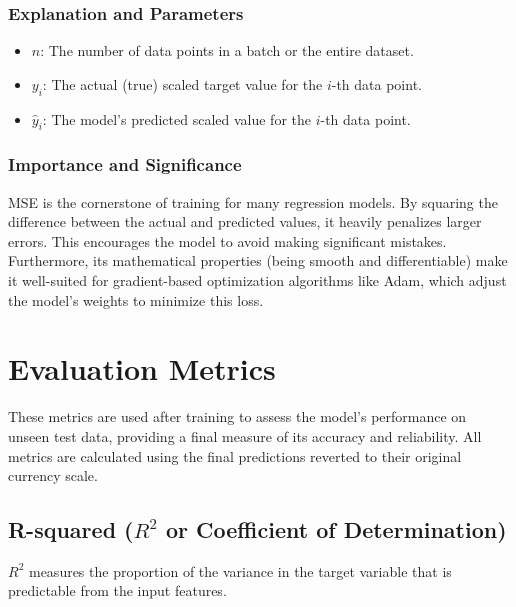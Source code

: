 \documentclass[12pt, a4paper]{article}
\begin{document}
\subsubsection{Explanation and Parameters}
\begin{itemize}
    \item \textbf{$n$}: The number of data points in a batch or the entire dataset.
    \item \textbf{$y_i$}: The actual (true) scaled target value for the $i$-th data point.
    \item \textbf{$\hat{y}_i$}: The model's predicted scaled value for the $i$-th data point.
\end{itemize}

\subsubsection{Importance and Significance}
MSE is the cornerstone of training for many regression models. By squaring the difference between the actual and predicted values, it heavily penalizes larger errors. This encourages the model to avoid making significant mistakes. Furthermore, its mathematical properties (being smooth and differentiable) make it well-suited for gradient-based optimization algorithms like Adam, which adjust the model's weights to minimize this loss.

\newpage
\section{Evaluation Metrics}
These metrics are used after training to assess the model's performance on unseen test data, providing a final measure of its accuracy and reliability. All metrics are calculated using the final predictions reverted to their original currency scale.

\subsection{R-squared ($R^2$ or Coefficient of Determination)}
$R^2$ measures the proportion of the variance in the target variable that is predictable from the input features.
\end{document}
